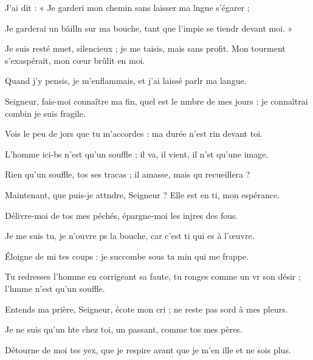 \item J’ai dit : « Je garderi mon chemin\psstar{} sans laisser ma lngue s’égarer ; 
\item Je garderai un bâilln sur ma bouche,\psstar{} tant que l’impie se tiendr devant moi. »
\item Je suis resté muet, silencieux ; je me taisis, mais sans profit.\psstar{} Mon tourment s’exaspérait, mon cœur brûlit en moi. 
\item Quand j’y pensis, je m’enflammais,\psstar{} et j’ai laissé parlr ma langue.
\item Seigneur, fais-moi connaître ma fin, quel est le nmbre de mes jours :\psstar{} je connaîtrai combin je suis fragile.
\item Vois le peu de jors que tu m’accordes :\psstar{} ma durée n’est rin devant toi. 
\item L’homme ici-bs n’est qu’un souffle ;\psstar{} il va, il vient, il n’st qu’une image. 
\item Rien qu’un souffle, tos ses tracas ;\psstar{} il amasse, mais qu recueillera ?
\item Maintenant, que puis-je attndre, Seigneur ?\psstar{} Elle est en ti, mon espérance.
\item Délivre-moi de tos mes péchés,\psstar{} épargne-moi les injres des fous.
\item Je me suis tu, je n’ouvre ps la bouche,\psstar{} car c’est ti qui es à l’œuvre.
\item Éloigne de mi tes coups :\psstar{} je succombe sous ta min qui me frappe.
\item Tu redresses l’homme en corrigeant sa faute,\pscross{} tu ronges comme un vr son désir ;\psstar{} l’hmme n’est qu’un souffle.
\item Entends ma prière, Seigneur, écote mon cri ;\psstar{} ne reste pas sord à mes pleurs. 
\item Je ne suis qu’un hte chez toi,\psstar{} un passant, comme tos mes pères.
\item Détourne de moi tes yex, que je respire\psstar{} avant que je m’en ille et ne sois plus.